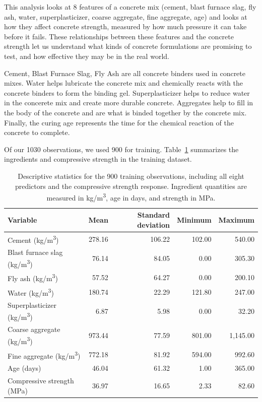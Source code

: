 \documentclass[12pt,letterpaper]{article}
\begin{document}
This analysis looks at 8 features of a concrete mix (cement, blast furnace slag, fly ash, water, superplasticizer, coarse aggregate, fine aggregate, age) and looks at how they affect concrete strength, measured by how much pressure it can take before it fails. These relationships between these features and the concrete strength let us understand what kinds of concrete formulations are promising to test, and how effective they may be in the real world.

Cement, Blast Furnace Slag, Fly Ash are all concrete binders used in concrete mixes. Water helps lubricate the concrete mix and chemically reacts with the concrete binders to form the binding gel. Superplasticizer helps to reduce water in the concerete mix and create more durable concrete. Aggregates help to fill in the body of the concrete and are what is binded together by the concrete mix. Finally, the curing age represents the time for the chemical reaction of the concrete to complete.

Of our 1030 observations, we used 900 for training. Table~\ref{tab:training-summary} summarizes the ingredients and compressive strength in the training dataset.

\begin{table}[H]
    \centering
    \caption{Descriptive statistics for the 900 training observations, including all eight predictors and the compressive strength response. Ingredient quantities are measured in kg/m\textsuperscript{3}, age in days, and strength in MPa.}
    \label{tab:training-summary}
    \begin{tabular}{lrrrr}
        \toprule
        \textbf{Variable} & \textbf{Mean} & \textbf{Standard deviation} & \textbf{Minimum} & \textbf{Maximum} \\
        \midrule
        Cement (kg/m\textsuperscript{3}) & 278.16 & 106.22 & 102.00 & 540.00 \\
        Blast furnace slag (kg/m\textsuperscript{3}) & 76.14 & 84.05 & 0.00 & 305.30 \\
        Fly ash (kg/m\textsuperscript{3}) & 57.52 & 64.27 & 0.00 & 200.10 \\
        Water (kg/m\textsuperscript{3}) & 180.74 & 22.29 & 121.80 & 247.00 \\
        Superplasticizer (kg/m\textsuperscript{3}) & 6.87 & 5.98 & 0.00 & 32.20 \\
        Coarse aggregate (kg/m\textsuperscript{3}) & 973.44 & 77.59 & 801.00 & 1,145.00 \\
        Fine aggregate (kg/m\textsuperscript{3}) & 772.18 & 81.92 & 594.00 & 992.60 \\
        Age (days) & 46.04 & 61.32 & 1.00 & 365.00 \\
        Compressive strength (MPa) & 36.97 & 16.65 & 2.33 & 82.60 \\
        \bottomrule
    \end{tabular}
\end{table}
\end{document}
